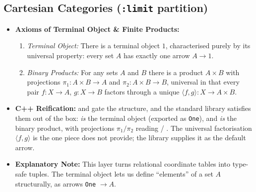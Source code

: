 \documentclass[11pt, a4paper]{article}
\begin{document}
\subsection{Cartesian Categories (\texttt{:limit} partition)}
\begin{itemize}
    \item \textbf{Axioms of Terminal Object \& Finite Products:}
    \begin{enumerate}
        \item \textit{Terminal Object:} There is a terminal object $1$, characterised purely by its universal property: every set $A$ has exactly one arrow $A \to 1$.
        \item \textit{Binary Products:} For any sets $A$ and $B$ there is a product $A \times B$ with projections $\pi_1: A \times B \to A$ and $\pi_2: A \times B \to B$, universal in that every pair $f: X \to A$, $g: X \to B$ factors through a unique $\langle f, g\rangle: X \to A \times B$.
    \end{enumerate}
    \item \textbf{C++ Reification:}  and  gate the structure, and the standard library satisfies them out of the box:  \emph{is} the terminal object (exported as \texttt{One}), and  \emph{is} the binary product, with projections $\pi_1 / \pi_2$ reading  / . The universal factorisation $\langle f, g\rangle$ is the one piece  does not provide; the library supplies it as the default  arrow.
    \item \textbf{Explanatory Note:} This layer turns relational coordinate tables into type-safe tuples. The terminal object lets us define ``elements'' of a set $A$ structurally, as arrows \texttt{One} $\to A$.
\end{itemize}
\end{document}
